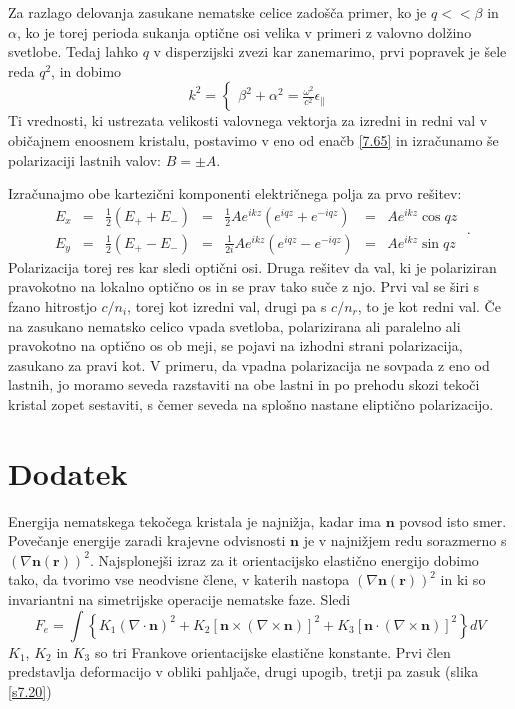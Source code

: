 Za razlago delovanja zasukane nematske celice zadošča primer, ko je
$q<<\beta$ in $\alpha$, ko je torej perioda sukanja optične osi
velika v primeri z valovno dolžino svetlobe. Tedaj lahko $q$ v disperzijski
zvezi kar zanemarimo, prvi popravek je šele reda $q^{2}$, in dobimo
\begin{equation}
k^{2}=\left\{ \begin{matrix}\beta^{2}+\alpha^{2}=\frac{\omega^{2}}{c^{2}}\epsilon_{\parallel}\end{matrix}\right.\label{7.67}
\end{equation}
 Ti vrednosti, ki ustrezata velikosti valovnega vektorja za izredni
in redni val v običajnem enoosnem kristalu, postavimo v eno od enačb
\ref{7.65} in izračunamo še polarizaciji lastnih valov: $B=\pm A$.

Izračunajmo obe kartezični komponenti električnega polja za prvo rešitev:
\begin{equation}
\begin{array}{lclclcl}
E_{x} & = & \frac{1}{2}(E_{+}+E_{-}) & = & \frac{1}{2}Ae^{ikz}(e^{iqz}+e^{-iqz}) & = & Ae^{ikz}\cos qz\\
E_{y} & = & \frac{1}{2}(E_{+}-E_{-}) & = & \frac{1}{2i}Ae^{ikz}(e^{iqz}-e^{-iqz}) & = & Ae^{ikz}\sin qz
\end{array}\;.\label{7.68}
\end{equation}
 Polarizacija torej res kar sledi optični osi. Druga rešitev da val,
ki je polariziran pravokotno na lokalno optično os in se prav tako
suče z njo. Prvi val se širi s fzano hitrostjo $c/n_{i}$, torej kot
izredni val, drugi pa s $c/n_{r}$, to je kot redni val. Če na zasukano
nematsko celico vpada svetloba, polarizirana ali paralelno ali pravokotno
na optično os ob meji, se pojavi na izhodni strani polarizacija, zasukano
za pravi kot. V primeru, da vpadna polarizacija ne sovpada z eno od
lastnih, jo moramo seveda razstaviti na obe lastni in po prehodu skozi
tekoči kristal zopet sestaviti, s čemer seveda na splošno nastane eliptično
polarizacijo.


\section{Dodatek}

Energija nematskega tekočega kristala je najnižja, kadar ima $\mathbf{n}$
povsod isto smer. Povečanje energije zaradi krajevne odvisnosti $\mathbf{n}$
je v najnižjem redu sorazmerno s $(\nabla\mathbf{n}(\mathbf{r}))^{2}$.
Najsplo\textquotedbl{}nejši izraz za {it orientacijsko elastično
energijo} dobimo tako, da tvorimo vse neodvisne člene, v katerih
nastopa $(\nabla\mathbf{n}(\mathbf{r}))^{2}$ in ki so invariantni na simetrijske
operacije nematske faze. Sledi\cite{degennes} 
\begin{equation}
F_{e}=\int\left\{ K_{1}(\nabla\cdot\mathbf{n})^{2}+K_{2}[\mathbf{n}\times(\nabla\times\mathbf{n})]^{2}+K_{3}[\mathbf{n}\cdot(\nabla\times\mathbf{n})]^{2}\right\} dV\label{7.70}
\end{equation}
 $K_{1}$, $K_{2}$ in $K_{3}$ so tri Frankove orientacijske elastične
konstante. Prvi člen predstavlja deformacijo v obliki pahljače, drugi
upogib, tretji pa zasuk (slika \ref{s7.20})

